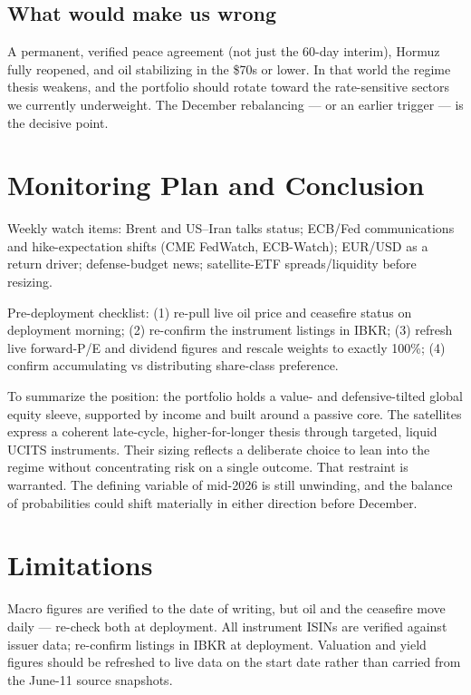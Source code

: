 \documentclass[11pt,a4paper]{article}
\begin{document}
\subsection{What would make us wrong}

A permanent, verified peace agreement (not just the 60-day interim), Hormuz fully reopened, and oil stabilizing in the \$70s or lower. In that world the regime thesis weakens, and the portfolio should rotate toward the rate-sensitive sectors we currently underweight. The December rebalancing --- or an earlier trigger --- is the decisive point.

\section{Monitoring Plan and Conclusion}

Weekly watch items: Brent and US--Iran talks status; ECB/Fed communications and hike-expectation shifts (CME FedWatch, ECB-Watch); EUR/USD as a return driver; defense-budget news; satellite-ETF spreads/liquidity before resizing.

Pre-deployment checklist: (1) re-pull live oil price and ceasefire status on deployment morning; (2) re-confirm the instrument listings in IBKR; (3) refresh live forward-P/E and dividend figures and rescale weights to exactly 100\%; (4) confirm accumulating vs distributing share-class preference.

To summarize the position: the portfolio holds a value- and defensive-tilted global equity sleeve, supported by income and built around a passive core. The satellites express a coherent late-cycle, higher-for-longer thesis through targeted, liquid UCITS instruments. Their sizing reflects a deliberate choice to lean into the regime without concentrating risk on a single outcome. That restraint is warranted. The defining variable of mid-2026 is still unwinding, and the balance of probabilities could shift materially in either direction before December.

\section*{Limitations}

Macro figures are verified to the date of writing, but oil and the ceasefire move daily --- re-check both at deployment. All instrument ISINs are verified against issuer data; re-confirm listings in IBKR at deployment. Valuation and yield figures should be refreshed to live data on the start date rather than carried from the June-11 source snapshots.
\end{document}
